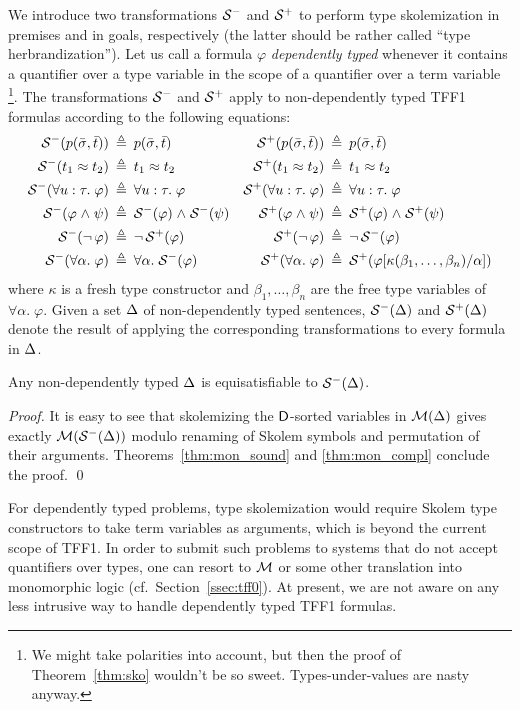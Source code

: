We introduce two transformations $\mathcal{S}^-$ and $\mathcal{S}^+$ to
perform type skolemization in premises and in goals, respectively
(the latter should be rather called ``type herbrandization'').
Let us call a formula $\varphi$ {\em dependently typed} whenever
it contains a quantifier over a type variable in the scope
of a quantifier over a term variable%
\footnote{We might take polarities into account, but then
the proof of Theorem~\ref{thm:sko} wouldn't be so sweet.
Types-under-values are nasty anyway.}.
The transformations $\mathcal{S}^-$ and $\mathcal{S}^+$ apply to
non-dependently typed TFF1 formulas according to the
following equations:
\begin{align*}
\mathcal{S}^-(p(\bar{\sigma},\bar{t})) &\:\triangleq\: p(\bar{\sigma},\bar{t}) &
\mathcal{S}^+(p(\bar{\sigma},\bar{t})) &\:\triangleq\: p(\bar{\sigma},\bar{t}) \\
\mathcal{S}^-(t_1 \approx t_2) &\:\triangleq\: t_1 \approx t_2 &
\mathcal{S}^+(t_1 \approx t_2) &\:\triangleq\: t_1 \approx t_2 \\
\mathcal{S}^-(\forall u \mathrel{:} \tau .\; \varphi) &\:\triangleq\: \forall u \mathrel{:} \tau .\; \varphi &
\mathcal{S}^+(\forall u \mathrel{:} \tau .\; \varphi) &\:\triangleq\: \forall u \mathrel{:} \tau .\; \varphi \\
\mathcal{S}^-(\varphi \mathrel{\land} \psi) &\:\triangleq\: \mathcal{S}^-(\varphi) \mathrel{\land} \mathcal{S}^-(\psi) &
\mathcal{S}^+(\varphi \mathrel{\land} \psi) &\:\triangleq\: \mathcal{S}^+(\varphi) \mathrel{\land} \mathcal{S}^+(\psi) \\
\mathcal{S}^-(\lnot\, \varphi) &\:\triangleq\: \lnot\, \mathcal{S}^+(\varphi) &
\mathcal{S}^+(\lnot\, \varphi) &\:\triangleq\: \lnot\, \mathcal{S}^-(\varphi) \\
\mathcal{S}^-(\forall \alpha .\; \varphi) &\:\triangleq\: \forall \alpha .\; \mathcal{S}^-(\varphi) &
\mathcal{S}^+(\forall \alpha .\; \varphi) &\:\triangleq\:
\mathcal{S}^+(\varphi[\kappa(\beta_1,\dots,\beta_n)/\alpha])
\end{align*}
where $\kappa$ is a fresh type constructor and $\beta_1,\dots,\beta_n$ are
the free type variables of $\forall \alpha .\; \varphi$.
Given a set $\mathrm{\Delta}$ of non-dependently typed sentences,
$\mathcal{S}^-(\mathrm{\Delta})$ and $\mathcal{S}^+(\mathrm{\Delta})$ denote the result of applying
the corresponding transformations to every formula in $\mathrm{\Delta}$.

\begin{theorem} \label{thm:sko}
Any non-dependently typed $\mathrm{\Delta}$ is equisatisfiable to $\mathcal{S}^-(\mathrm{\Delta})$.
\end{theorem}
\begin{proof}
It is easy to see that
skolemizing the $\mathsf{D}$-sorted variables in $\mathcal{M}(\mathrm{\Delta})$ gives
exactly $\mathcal{M}(\mathcal{S}^-(\mathrm{\Delta}))$ modulo renaming of Skolem symbols and
permutation of their arguments. Theorems~\ref{thm:mon_sound} and
\ref{thm:mon_compl} conclude the proof.
\qed
\end{proof}

For dependently typed problems, type skolemization would require
Skolem type constructors to take term variables as arguments,
which is beyond the current scope of TFF1. In order to submit such
problems to systems that do not accept quantifiers over types,
one can resort to $\mathcal{M}$ or some other translation into monomorphic
logic (cf.~Section~\ref{ssec:tff0}). At present, we are not aware
on any less intrusive way to handle dependently typed TFF1 formulas.

